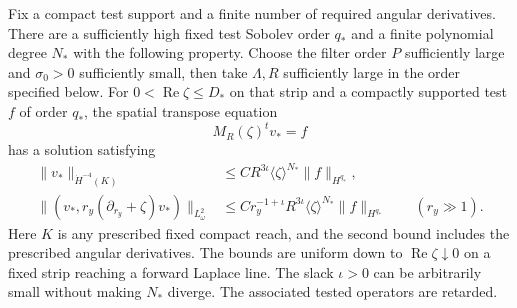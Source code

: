 \begin{proposition}\label{st:retarded-tests}
Fix a compact test support and a finite number of required
angular derivatives.  There are a sufficiently high fixed
test Sobolev order $q_*$ and a finite polynomial degree $N_*$
with the following property.  Choose the filter order $P$
sufficiently large and $\sigma_0>0$ sufficiently small, then
take $\Lambda,R$ sufficiently large in the order specified
below.  For $0<\operatorname{Re}\zeta\leq D_*$ on that strip
and a compactly supported test $f$ of order $q_*$, the spatial
transpose equation
\[
 M_R(\zeta)^t v_*=f
\]
has a solution satisfying
\begin{align}
 \|v_*\|_{\dot H^{-4}(K)}
 &\leq C R^{3\iota}\langle\zeta\rangle^{N_*}
                       \|f\|_{H^{q_*}},
 \label{st:test-compact}\\
 \|(v_*,r_y(\partial_{r_y}+\zeta)v_*)\|_{L^2_\omega}
 &\leq C r_y^{-1+\iota}R^{3\iota}
                \langle\zeta\rangle^{N_*}\|f\|_{H^{q_*}}
       \qquad(r_y\gg1).
 \label{st:test-radiation}
\end{align}
Here $K$ is any prescribed fixed compact reach, and the second
bound includes the prescribed angular derivatives.
The bounds are uniform down to
$\operatorname{Re}\zeta\downarrow0$ on a fixed strip reaching
a forward Laplace line.  The slack $\iota>0$ can be arbitrarily
small without making $N_*$ diverge.  The associated tested
operators are retarded.
\end{proposition}

